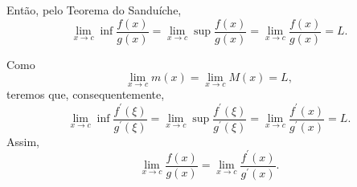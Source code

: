 \documentclass{article}
\begin{document}
Então, pelo Teorema do Sanduíche,
\begin{equation}
 \lim_{x \to c} \inf \frac{f(x)}{g(x)} = \lim_{x \to c} \sup \frac{f(x)}{g(x)}=  \lim_{x \to c} \frac{f(x)}{g(x)} = L.
\end{equation}

Como
\begin{equation}
 \lim_{x \to c} m(x) = \lim_{x \to c} M(x) = L,
\end{equation}
teremos que, consequentemente,
\begin{equation}
 \lim_{x \to c}\inf{\frac{f^{\prime}(\xi)}{g^{\prime}(\xi)}} = \lim_{x \to c} \sup{\frac{f^{\prime}(\xi)}{g^{\prime}(\xi)}} =
 \lim_{x \to c} \frac{f^{\prime}(x)}{g^{\prime}(x)} = L.
\end{equation}
Assim,
\begin{equation}
 \lim_{x \to c} \frac{f(x)}{g(x)} = \lim_{x \to c} \frac{f^{\prime}(x)}{g^{\prime}(x)}.
\end{equation}
\end{document}
